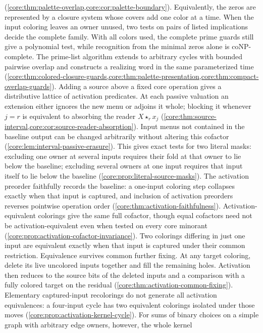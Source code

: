 (\cref{core:thm:palette-overlap,core:cor:palette-boundary}).
Equivalently, the zeros are represented by a closure system whose
covers add one color at a time. When the input coloring leaves an owner
unused, two tests on pairs of listed implications decide the complete
family. With all colors used, the complete prime guards still give a
polynomial test, while recognition from the minimal zeros alone is
coNP-complete. The prime-list algorithm extends to arbitrary cycles
with bounded pairwise overlap and constructs a realizing word in the
same parameterized time
(\cref{core:thm:colored-closure-guards,core:thm:palette-presentation,core:thm:compact-overlap-guards}).
Adding a source
above a fixed core operation gives a distributive lattice of activation
predicates. At each passive valuation an extension either ignores the
new menu or adjoins it whole; blocking it whenever $j=r$ is equivalent
to absorbing the reader $X\star_r x_j$
(\cref{core:thm:source-interval,core:cor:source-reader-absorption}).
Input menus not contained in the baseline output can be changed
arbitrarily without altering this cofactor
(\cref{core:lem:interval-passive-erasure}).
This gives exact tests for two literal masks: excluding one owner at
several inputs requires their fold at that owner to lie below the
baseline; excluding several owners at one input requires that input
itself to lie below the baseline
(\cref{core:prop:literal-source-masks}).
The activation preorder faithfully records the baseline: a one-input
coloring step collapses exactly when that input is captured, and
inclusion of activation preorders reverses pointwise operation order
(\cref{core:thm:activation-faithfulness}). Activation-equivalent
colorings give the same full cofactor, though equal cofactors need not
be activation-equivalent even when tested on every core minorant
(\cref{core:prop:activation-cofactor-invariance}). Two colorings
differing in just one input are equivalent exactly when that input
is captured under their common restriction.
Equivalence survives common further fixing. At any target coloring,
delete its live uncolored inputs together and fill the remaining
holes. Activation then reduces to the source bits of the deleted
inputs and a comparison with a fully colored target on the residual
(\cref{core:thm:activation-common-fixing}). Elementary captured-input
recolorings do not generate all activation equivalences: a four-input
cycle has two equivalent colorings isolated under those moves
(\cref{core:prop:activation-kernel-cycle}). For sums of binary choices
on a simple graph with arbitrary edge owners, however, the whole kernel

